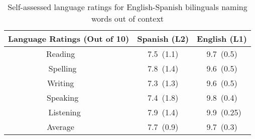 %
\begin{table}[hptb]
\begin{center}
\begin{tabular}{|c|c|c|} \hline
\multicolumn{1}{|c|}{Language Ratings (Out of 10)}&\multicolumn{1}{c|}{Spanish (L2)}&\multicolumn{1}{c|}{English (L1)}\\ \hline
Reading~~~~&~7.5~(1.1)~&~9.7~(0.5)~\\ 
Spelling~~~&~7.8~(1.4)~&~9.6~(0.5)~\\ 
Writing~~~~&~7.3~(1.3)~&~9.6~(0.5)~\\ 
Speaking~~~&~7.4~(1.8)~&~9.8~(0.4)~\\ 
Listening~~&~7.9~(1.4)~&~9.9~(0.25)\\ 
Average~~~~&~7.7~(0.9)~&~9.7~(0.3)~\\ 
\hline
\end{tabular}
\caption{Self-assessed language ratings for English-Spanish bilinguals naming words out of context}\label{es_lr}
\end{center}
\end{table}
